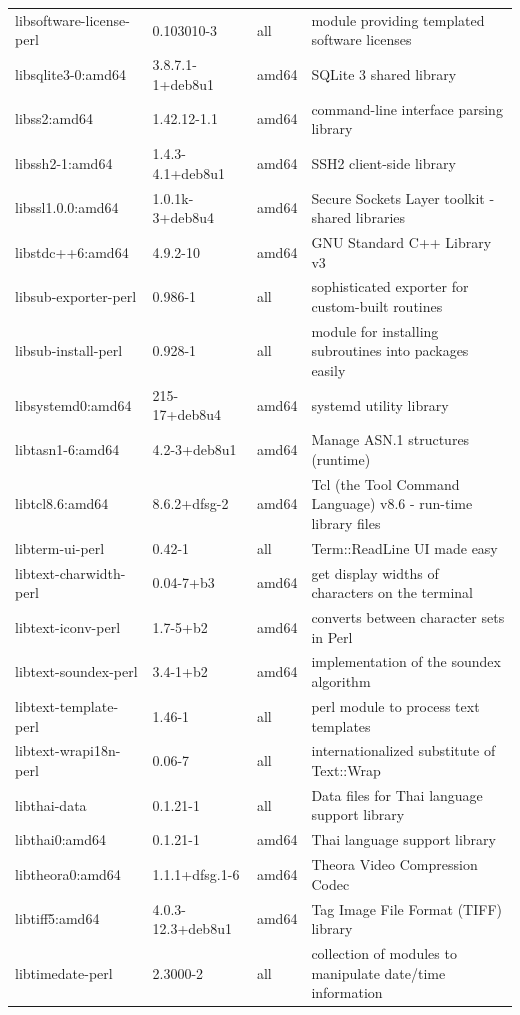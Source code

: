 \documentclass[a4paper,10pt]{article}
\begin{document}
\begin{appendices}
{\begin{longtable}{p{3.25cm}@{\hspace{0.25cm}}p{4cm}@{\hspace{0.25cm}}l@{\hspace{0.25cm}}p{7cm}}
libsoftware-license-perl	&	0.103010-3	&	all	&	module providing templated software licenses	\\
libsqlite3-0:amd64	&	3.8.7.1-1+deb8u1	&	amd64	&	SQLite 3 shared library	\\
libss2:amd64	&	1.42.12-1.1	&	amd64	&	command-line interface parsing library	\\
libssh2-1:amd64	&	1.4.3-4.1+deb8u1	&	amd64	&	SSH2 client-side library	\\
libssl1.0.0:amd64	&	1.0.1k-3+deb8u4	&	amd64	&	Secure Sockets Layer toolkit - shared libraries	\\
libstdc++6:amd64	&	4.9.2-10	&	amd64	&	GNU Standard C++ Library v3	\\
libsub-exporter-perl	&	0.986-1	&	all	&	sophisticated exporter for custom-built routines	\\
libsub-install-perl	&	0.928-1	&	all	&	module for installing subroutines into packages easily	\\
libsystemd0:amd64	&	215-17+deb8u4	&	amd64	&	systemd utility library	\\
libtasn1-6:amd64	&	4.2-3+deb8u1	&	amd64	&	Manage ASN.1 structures (runtime)	\\
libtcl8.6:amd64	&	8.6.2+dfsg-2	&	amd64	&	Tcl (the Tool Command Language) v8.6 - run-time library files	\\
libterm-ui-perl	&	0.42-1	&	all	&	Term::ReadLine UI made easy	\\
libtext-charwidth-perl	&	0.04-7+b3	&	amd64	&	get display widths of characters on the terminal	\\
libtext-iconv-perl	&	1.7-5+b2	&	amd64	&	converts between character sets in Perl	\\
libtext-soundex-perl	&	3.4-1+b2	&	amd64	&	implementation of the soundex algorithm	\\
libtext-template-perl	&	1.46-1	&	all	&	perl module to process text templates	\\
libtext-wrapi18n-perl	&	0.06-7	&	all	&	internationalized substitute of Text::Wrap	\\
libthai-data	&	0.1.21-1	&	all	&	Data files for Thai language support library	\\
libthai0:amd64	&	0.1.21-1	&	amd64	&	Thai language support library	\\
libtheora0:amd64	&	1.1.1+dfsg.1-6	&	amd64	&	Theora Video Compression Codec	\\
libtiff5:amd64	&	4.0.3-12.3+deb8u1	&	amd64	&	Tag Image File Format (TIFF) library	\\
libtimedate-perl	&	2.3000-2	&	all	&	collection of modules to manipulate date/time information	\\

\end{longtable}}
\end{appendices}
\end{document}
